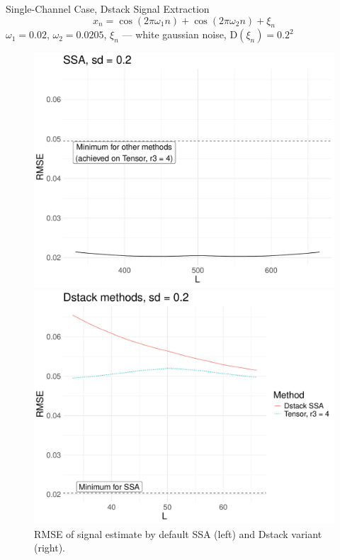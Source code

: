 \documentclass[pdf, unicode, ucs, notheorems]{beamer}
\theoremstyle{definition}
\begin{document}
\begin{frame}{ Single-Channel Case, Dstack Signal Extraction}
  \vspace*{-0.3cm}
  \[
    x_{n} = \cos(2 \pi \omega_1 n) +
    \cos(2 \pi \omega_2 n) + \xi_n
  \]
  $\omega_1 = 0.02,\, \omega_2 = 0.0205$, $\xi_n$ --- white gaussian
  noise, $\mathrm{D}(\xi_n) = 0.2^2$

  \begin{figure}[!ht]
    \begin{minipage}{0.48\textwidth}
      \centering
      \includegraphics[width=\textwidth]{htlsd_byL_real_rec_rmse_ssa_2.pdf}
    \end{minipage}
    \begin{minipage}{0.48\textwidth}
      \centering
      \includegraphics[width=\textwidth]{htlsd_byL_real_rec_rmse_dstack_2.pdf}
    \end{minipage}
    \caption{RMSE of signal estimate by default SSA
    (left) and Dstack variant (right).}
  \end{figure}
\end{frame}
\end{document}
